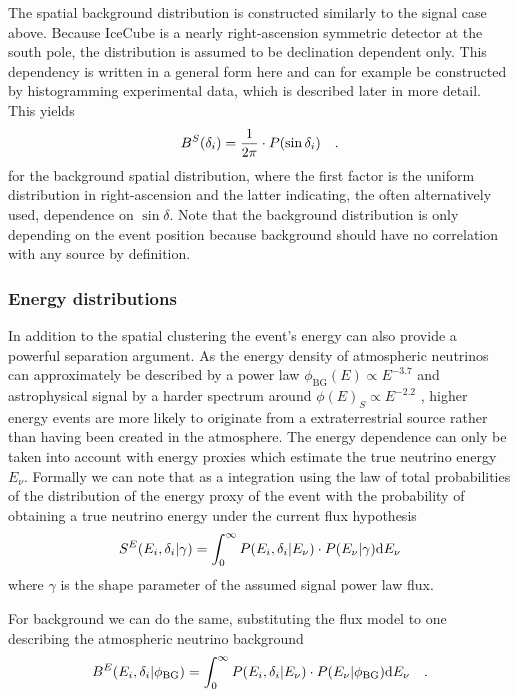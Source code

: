 The spatial background distribution is constructed similarly to the signal case above.
Because IceCube is a nearly right-ascension symmetric detector at the south pole, the distribution is assumed to be declination dependent only.
This dependency is written in a general form here and can for example be constructed by histogramming experimental data, which is described later in more detail.
This yields
\begin{equation}
  B^S(\delta_i) = \frac{1}{2\pi} \cdot P(\sin\delta_i)
  \quad\text{.}
\end{equation}
for the background spatial distribution, where the first factor is the uniform distribution in right-ascension and the latter indicating, the often alternatively used, dependence on $\sin\delta$.
Note that the background distribution is only depending on the event position because background should have no correlation with any source by definition.

\subsubsection*{Energy distributions}
In addition to the spatial clustering the event's energy can also provide a powerful separation argument.
As the energy density of atmospheric neutrinos can approximately be described by a power law $\phi_\mathrm{BG}(E) \propto E^{-3.7}$ and astrophysical signal by a harder spectrum around $\phi(E)_S \propto E^{-2.2}$ , higher energy events are more likely to originate from a extraterrestrial source rather than having been created in the atmosphere.
The energy dependence can only be taken into account with energy proxies which estimate the true neutrino energy $E_\nu$.
Formally we can note that as a integration using the law of total probabilities of the distribution of the energy proxy of the event with the probability of obtaining a true neutrino energy under the current flux hypothesis
\begin{equation}
  S^E(E_i, \delta_i|\gamma) =
    \int_0^\infty P(E_i,\delta_i|E_\nu)\cdot P(E_\nu|\gamma) \mathrm{d}E_\nu
\end{equation}
where $\gamma$ is the shape parameter of the assumed signal power law flux.

For background we can do the same, substituting the flux model to one describing the atmospheric neutrino background
\begin{equation}
  B^E(E_i, \delta_i|\phi_\mathrm{BG}) =
    \int_0^\infty P(E_i,\delta_i|E_\nu)\cdot P(E_\nu|\phi_\mathrm{BG}) \mathrm{d}E_\nu
    \quad\text{.}
\end{equation}


